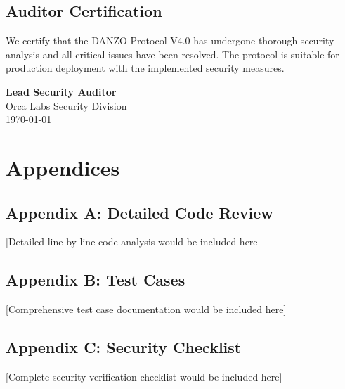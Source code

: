 \documentclass[11pt,a4paper]{article}
\begin{document}
\subsection{Auditor Certification}
We certify that the DANZO Protocol V4.0 has undergone thorough security analysis and all critical issues have been resolved. The protocol is suitable for production deployment with the implemented security measures.

\vspace{2cm}

\noindent\textbf{Lead Security Auditor}\\
Orca Labs Security Division\\
\today

\section{Appendices}

\subsection{Appendix A: Detailed Code Review}
[Detailed line-by-line code analysis would be included here]

\subsection{Appendix B: Test Cases}
[Comprehensive test case documentation would be included here]

\subsection{Appendix C: Security Checklist}
[Complete security verification checklist would be included here]
\end{document}
